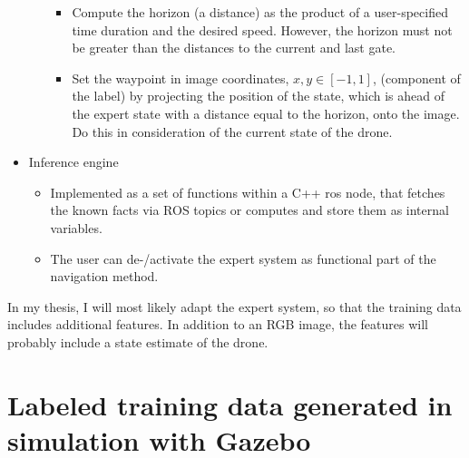 \begin{itemize}
\begin{itemize}
\begin{itemize}
			\item Compute the horizon (a distance) as the product of a user-specified time duration and the desired speed. 
			However, the horizon must not be greater than the distances to the current and last gate.
			\item Set the waypoint in image coordinates, $x, y \in [-1, 1]$, (component of the label) by projecting the position of the state,
			which is ahead of the expert state with a distance equal to the horizon, onto the image. 
			Do this in consideration of the current state of the drone.
		\end{itemize}
	\end{itemize} 
	\item Inference engine
	\begin{itemize}
		\item Implemented as a set of functions within a C++ ros node, that fetches the known facts via ROS topics or computes and store them as internal variables.
		\item The user can de-/activate the expert system as functional part of the navigation method.
	\end{itemize} 
\end{itemize}

In my thesis, I will most likely adapt the expert system,
so that the training data includes additional features.
In addition to an RGB image, the features will probably include a state estimate of the drone.





\section{Labeled training data generated in simulation with Gazebo}\label{sec:GazeboTrainingData}

